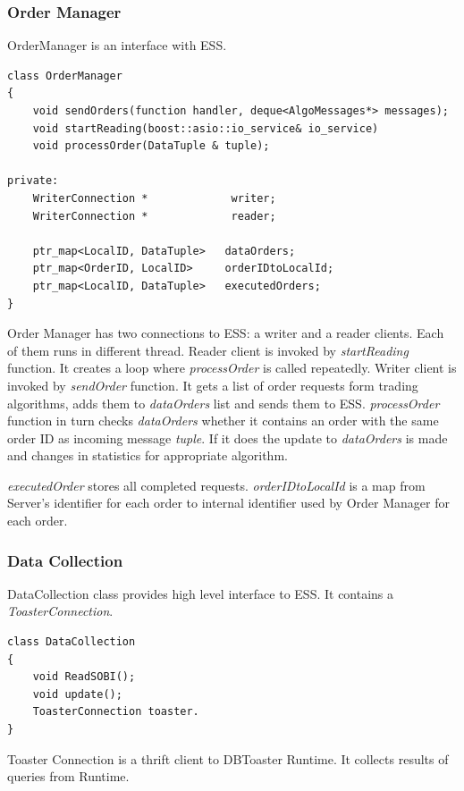 \documentclass[14pt]{article}
\begin{document}
\subsubsection{Order Manager}
OrderManager is an interface with ESS. 

\begin{verbatim}
class OrderManager
{
    void sendOrders(function handler, deque<AlgoMessages*> messages);
    void startReading(boost::asio::io_service& io_service)
    void processOrder(DataTuple & tuple);
    
private:
    WriterConnection *             writer;
    WriterConnection *             reader;

    ptr_map<LocalID, DataTuple>   dataOrders;
    ptr_map<OrderID, LocalID>     orderIDtoLocalId;
    ptr_map<LocalID, DataTuple>   executedOrders;
}
\end{verbatim}

Order Manager has two connections to ESS: a writer and a reader clients. Each of them runs in different thread. Reader client is invoked by \emph{startReading} function. It creates a loop where \emph{processOrder} is called repeatedly. Writer client is invoked by \emph{sendOrder} function. It gets a list of order requests form trading algorithms, adds them to \emph{dataOrders} list and sends them to ESS. \emph{processOrder} function in turn checks \emph{dataOrders} whether it contains an order with the same order ID as incoming message \emph{tuple}. If it does the update to \emph{dataOrders} is made and changes in statistics for appropriate algorithm.

\emph{executedOrder} stores all completed requests. \emph{orderIDtoLocalId} is a map from Server's identifier for each order to internal identifier used by Order Manager for each order.


\subsubsection{Data Collection}
DataCollection class provides high level interface to ESS. It contains a \emph{ToasterConnection}. 

\begin{verbatim}
class DataCollection
{
    void ReadSOBI();
    void update();
    ToasterConnection toaster.
}
\end{verbatim}

Toaster Connection is a thrift client to DBToaster Runtime. It collects results of queries from Runtime. 
\end{document}
